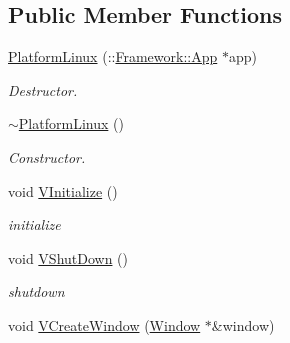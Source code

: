 \subsection*{Public Member Functions}
\begin{DoxyCompactItemize}
\item 
\hypertarget{classPlatform_1_1PlatformLinux_ad25da23bbd166806df3503c2e7255782}{
\hyperlink{classPlatform_1_1PlatformLinux_ad25da23bbd166806df3503c2e7255782}{PlatformLinux} (::\hyperlink{classFramework_1_1App}{Framework::App} $\ast$app)}
\label{classPlatform_1_1PlatformLinux_ad25da23bbd166806df3503c2e7255782}

\begin{DoxyCompactList}\small\item\em Destructor. \item\end{DoxyCompactList}\item 
\hypertarget{classPlatform_1_1PlatformLinux_ae9e84374f976600523211e320d52d533}{
\hyperlink{classPlatform_1_1PlatformLinux_ae9e84374f976600523211e320d52d533}{$\sim$PlatformLinux} ()}
\label{classPlatform_1_1PlatformLinux_ae9e84374f976600523211e320d52d533}

\begin{DoxyCompactList}\small\item\em Constructor. \item\end{DoxyCompactList}\item 
\hypertarget{classPlatform_1_1PlatformLinux_a23752421d262dd8017d11a78a6bfd53f}{
void \hyperlink{classPlatform_1_1PlatformLinux_a23752421d262dd8017d11a78a6bfd53f}{VInitialize} ()}
\label{classPlatform_1_1PlatformLinux_a23752421d262dd8017d11a78a6bfd53f}

\begin{DoxyCompactList}\small\item\em initialize \item\end{DoxyCompactList}\item 
\hypertarget{classPlatform_1_1PlatformLinux_a684e8749b7178c71ef40f325c5f70f3d}{
void \hyperlink{classPlatform_1_1PlatformLinux_a684e8749b7178c71ef40f325c5f70f3d}{VShutDown} ()}
\label{classPlatform_1_1PlatformLinux_a684e8749b7178c71ef40f325c5f70f3d}

\begin{DoxyCompactList}\small\item\em shutdown \item\end{DoxyCompactList}\item 
\hypertarget{classPlatform_1_1PlatformLinux_a675d37313bf2aadeaaf684e31fae3192}{
void \hyperlink{classPlatform_1_1PlatformLinux_a675d37313bf2aadeaaf684e31fae3192}{VCreateWindow} (\hyperlink{classPlatform_1_1Window}{Window} $\ast$\&window)}
\label{classPlatform_1_1PlatformLinux_a675d37313bf2aadeaaf684e31fae3192}


\end{DoxyCompactItemize}
